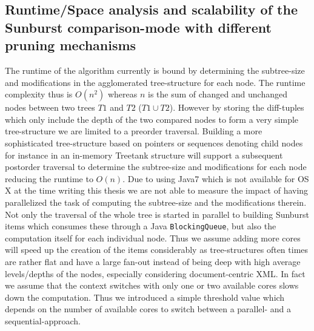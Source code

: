 \subsection{Runtime/Space analysis and scalability of the Sunburst comparison-mode with different pruning mechanisms}
The runtime of the algorithm currently is bound by determining the subtree-size and modifications in the agglomerated tree-structure for each node. The runtime complexity thus is $O(n^2)$ whereas $n$ is the sum of changed and unchanged nodes between two trees $T1$ and $T2$ ($T1 \cup T2$). However by storing the diff-tuples which only include the depth of the two compared nodes to form a very simple tree-structure we are limited to a preorder traversal. Building a more sophisticated tree-structure based on pointers or sequences denoting child nodes for instance in an in-memory Treetank structure will support a subsequent postorder traversal to determine the subtree-size and modifications for each node reducing the runtime to $O(n)$. Due to using Java7 which is not available for OS X at the time writing this thesis we are not able to measure the impact of having parallelized the task of computing the subtree-size and the modifications therein. Not only the traversal of the whole tree is started in parallel to building Sunburst items which consumes these through a Java \texttt{BlockingQueue}, but also the computation itself for each individual node. Thus we assume adding more cores will speed up the creation of the items considerably as tree-structures often times are rather flat and have a large fan-out instead of being deep with high average levels/depths of the nodes, especially considering document-centric XML\cite{ronnau2009efficient}. In fact we assume that the context switches with only one or two available cores slows down the computation. Thus we introduced a simple threshold value which depends on the number of available cores to switch between a parallel- and a sequential-approach. 

